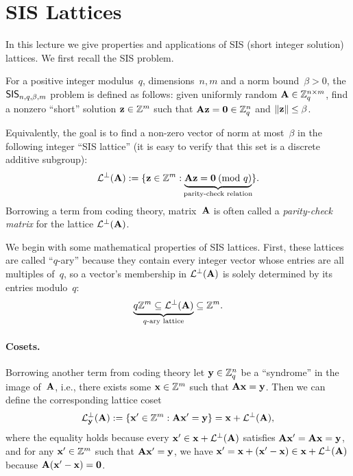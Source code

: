 \documentclass[11pt]{article}
\begin{document}
\thispagestyle{fancy} %



\section{SIS Lattices}
\label{sec:sis-lat}

In this lecture we give properties and applications of SIS (short
integer solution) lattices. We first recall the SIS problem.

\begin{definition}
  \label{def:sis-problem}
  For a positive integer modulus~$q$, dimensions~$n,m$ and a norm
  bound~$\beta > 0$, the $\mathsf{SIS}_{n,q,\beta,m}$ problem is defined as
  follows: given uniformly random $\mathbf{A} \in \mathbb{Z}_q^{n \times m}$, find a
  nonzero ``short'' solution $\mathbf{z} \in \mathbb{Z}^{m}$ such that
  $\mathbf{A} \mathbf{z} = \mathbf{0} \in \mathbb{Z}_q^{n}$ and
  $\lVert\mathbf{z}\rVert \leq \beta$.

  Equivalently, the goal is to find a non-zero vector of norm at
  most~$\beta$ in the following integer ``SIS lattice'' (it is easy to
  verify that this set is a discrete additive subgroup):
  \[ \latperp(\matA) := \set{\vecz \in \Z^{m} : \underbrace{\matA\vecz
        = \veczero \pmod*{q}}_{\mathclap{\text{parity-check
            relation}}}} . \] Borrowing a term from coding theory,
  matrix~$\mathbf{A}$ is often called a \emph{parity-check matrix} for the
  lattice $\mathcal{L}^{\perp}(\mathbf{A})$.
\end{definition}

We begin with some mathematical properties of SIS lattices. First,
these lattices are called ``$q$-ary'' because they contain every
integer vector whose entries are all multiples of~$q$, so a vector's
membership in $\mathcal{L}^{\perp}(\mathbf{A})$ is solely determined by its entries
modulo~$q$:
\[
  \underbrace{q\mathbb{Z}^{m} \subseteq \mathcal{L}^{\perp}(\mathbf{A})}_{q\text{-ary
      lattice}} \subseteq \mathbb{Z}^{m}.
\]

\paragraph{Cosets.}

Borrowing another term from coding theory let $\mathbf{y} \in \mathbb{Z}_q^{n}$ be a
``syndrome'' in the image of~$\mathbf{A}$, i.e., there exists some
$\mathbf{x} \in \mathbb{Z}^{m}$ such that $\mathbf{A} \mathbf{x} = \mathbf{y}$. Then we can define
the corresponding lattice coset
\[
  \mathcal{L}^{\perp}_{\mathbf{y}}(\mathbf{A}) := \{ \mathbf{x}' \in \mathbb{Z}^m : \mathbf{A} \mathbf{x}' =
    \mathbf{y} \} = \mathbf{x} + \mathcal{L}^{\perp}(\mathbf{A}) , \] where the equality holds
because every $\mathbf{x}' \in \mathbf{x} + \mathcal{L}^{\perp}(\mathbf{A})$ satisfies
$\mathbf{A} \mathbf{x}' = \mathbf{A} \mathbf{x} = \mathbf{y}$, and for any $\mathbf{x}' \in \mathbb{Z}^{m}$
such that $\mathbf{A} \mathbf{x}' = \mathbf{y}$, we have
$\mathbf{x}' = \mathbf{x} + (\mathbf{x}' - \mathbf{x}) \in \mathbf{x} + \mathcal{L}^{\perp}(\mathbf{A})$
because $\mathbf{A} (\mathbf{x}'-\mathbf{x}) = \mathbf{0}$.
\end{document}
